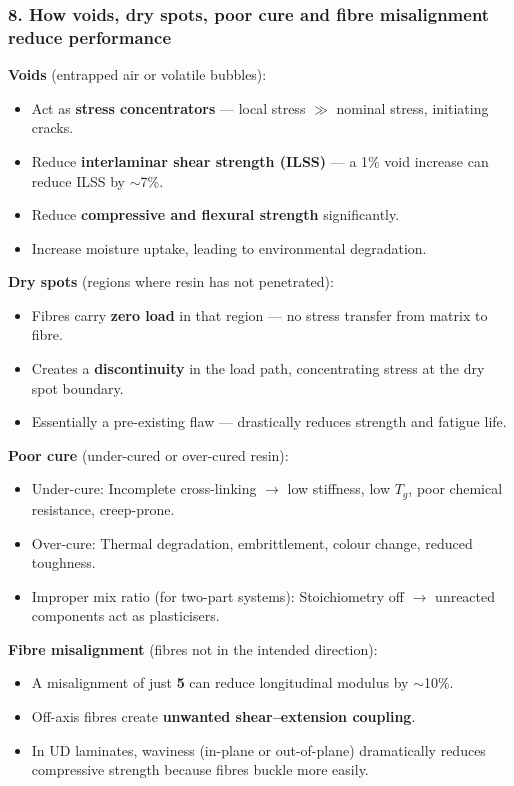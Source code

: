 \documentclass{NoteThesis/note-thesis}
\begin{document}
\subsubsection*{8. How voids, dry spots, poor cure and fibre misalignment reduce performance}

\textbf{Voids} (entrapped air or volatile bubbles):
\begin{itemize}
    \item Act as \textbf{stress concentrators} — local stress $\gg$ nominal stress, initiating cracks.
    \item Reduce \textbf{interlaminar shear strength (ILSS)} — a 1\% void increase can reduce ILSS by $\sim$7\%.
    \item Reduce \textbf{compressive and flexural strength} significantly.
    \item Increase moisture uptake, leading to environmental degradation.
\end{itemize}

\textbf{Dry spots} (regions where resin has not penetrated):
\begin{itemize}
    \item Fibres carry \textbf{zero load} in that region — no stress transfer from matrix to fibre.
    \item Creates a \textbf{discontinuity} in the load path, concentrating stress at the dry spot boundary.
    \item Essentially a pre-existing flaw — drastically reduces strength and fatigue life.
\end{itemize}

\textbf{Poor cure} (under-cured or over-cured resin):
\begin{itemize}
    \item Under-cure: Incomplete cross-linking $\to$ low stiffness, low $T_g$, poor chemical resistance, creep-prone.
    \item Over-cure: Thermal degradation, embrittlement, colour change, reduced toughness.
    \item Improper mix ratio (for two-part systems): Stoichiometry off $\to$ unreacted components act as plasticisers.
\end{itemize}

\textbf{Fibre misalignment} (fibres not in the intended direction):
\begin{itemize}
    \item A misalignment of just \textbf{5\textdegree} can reduce longitudinal modulus by $\sim$10\%.
    \item Off-axis fibres create \textbf{unwanted shear--extension coupling}.
    \item In UD laminates, waviness (in-plane or out-of-plane) dramatically reduces compressive strength because fibres buckle more easily.
\end{itemize}
\end{document}
